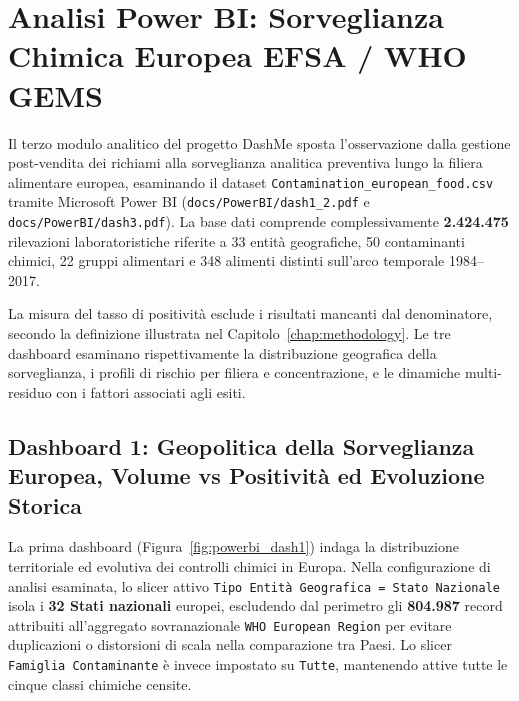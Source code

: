 \chapter{Analisi Power BI: Sorveglianza Chimica Europea EFSA / WHO GEMS}
\label{chap:powerbi}

Il terzo modulo analitico del progetto DashMe sposta l'osservazione dalla gestione post-vendita dei richiami alla sorveglianza analitica preventiva lungo la filiera alimentare europea, esaminando il dataset \texttt{Contamination\_european\_food.csv} tramite Microsoft Power BI (\texttt{docs/PowerBI/dash1\_2.pdf} e \texttt{docs/PowerBI/dash3.pdf}). La base dati comprende complessivamente \textbf{2.424.475} rilevazioni laboratoristiche riferite a 33 entità geografiche, 50 contaminanti chimici, 22 gruppi alimentari e 348 alimenti distinti sull'arco temporale 1984--2017.

La misura del tasso di positività esclude i risultati mancanti dal denominatore, secondo la definizione illustrata nel Capitolo~\ref{chap:methodology}. Le tre dashboard esaminano rispettivamente la distribuzione geografica della sorveglianza, i profili di rischio per filiera e concentrazione, e le dinamiche multi-residuo con i fattori associati agli esiti.

\section{Dashboard 1: Geopolitica della Sorveglianza Europea, Volume vs Positività ed Evoluzione Storica}
\label{sec:powerbi_dash1}

La prima dashboard (Figura~\ref{fig:powerbi_dash1}) indaga la distribuzione territoriale ed evolutiva dei controlli chimici in Europa. Nella configurazione di analisi esaminata, lo slicer attivo \texttt{Tipo Entità Geografica = Stato Nazionale} isola i \textbf{32 Stati nazionali} europei, escludendo dal perimetro gli \textbf{804.987} record attribuiti all'aggregato sovranazionale \texttt{WHO European Region} per evitare duplicazioni o distorsioni di scala nella comparazione tra Paesi. Lo slicer \texttt{Famiglia Contaminante} è invece impostato su \texttt{Tutte}, mantenendo attive tutte le cinque classi chimiche censite.


